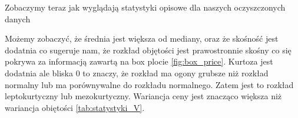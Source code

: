 \documentclass[12pt,leqno]{article}
\theoremstyle{exer}
\begin{document}
		Zobaczymy teraz jak wyglądają statystyki opisowe dla naszych oczyszczonych danych
	
	\begin{table}[H]
		\caption{Podstawowe statystyki opisowe dla objętości}
		\label{tab:statystyki_price}
	\end{table}
	Możemy zobaczyć, że średnia jest większa od mediany, oraz że skośność jest dodatnia co sugeruje nam, że rozkład objętości jest prawostronnie skośny co się pokrywa za informacją zawartą na box plocie \ref{fig:box_price}. Kurtoza jest dodatnia  ale bliska $0$ to znaczy, że rozkład ma ogony grubsze niż rozkład normalny lub ma porównywalne do rozkładu normalnego. Zatem jest to rozkład leptokurtyczny lub mezokurtyczny. Wariancja ceny jest znacząco większa niż wariancja obiętości \ref{tab:statystyki_V}.  
	
\end{document}
